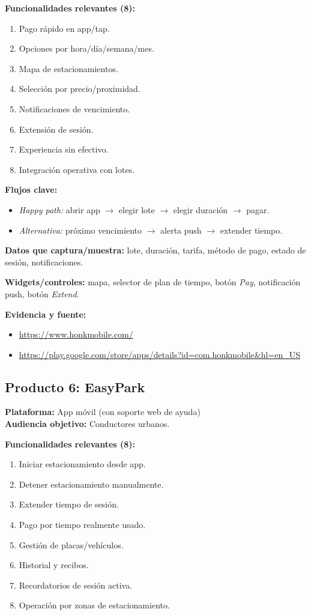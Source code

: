 \documentclass[11pt]{article}
\begin{document}
\textbf{Funcionalidades relevantes (8):}
\begin{enumerate}
\item Pago rápido en app/tap.
\item Opciones por hora/día/semana/mes.
\item Mapa de estacionamientos.
\item Selección por precio/proximidad.
\item Notificaciones de vencimiento.
\item Extensión de sesión.
\item Experiencia sin efectivo.
\item Integración operativa con lotes.
\end{enumerate}

\textbf{Flujos clave:}
\begin{itemize}
\item \textit{Happy path:} abrir app $\rightarrow$ elegir lote $\rightarrow$ elegir duración $\rightarrow$ pagar.
\item \textit{Alternativa:} próximo vencimiento $\rightarrow$ alerta push $\rightarrow$ extender tiempo.
\end{itemize}

\textbf{Datos que captura/muestra:} lote, duración, tarifa, método de pago, estado de sesión, notificaciones.

\textbf{Widgets/controles:} mapa, selector de plan de tiempo, botón \textit{Pay}, notificación push, botón \textit{Extend}.

\textbf{Evidencia y fuente:}
\begin{itemize}
\item \url{https://www.honkmobile.com/}
\item \url{https://play.google.com/store/apps/details?id=com.honkmobile&hl=en_US}
\end{itemize}

\subsection{Producto 6: EasyPark}
\textbf{Plataforma:} App móvil (con soporte web de ayuda)\\
\textbf{Audiencia objetivo:} Conductores urbanos.

\textbf{Funcionalidades relevantes (8):}
\begin{enumerate}
\item Iniciar estacionamiento desde app.
\item Detener estacionamiento manualmente.
\item Extender tiempo de sesión.
\item Pago por tiempo realmente usado.
\item Gestión de placas/vehículos.
\item Historial y recibos.
\item Recordatorios de sesión activa.
\item Operación por zonas de estacionamiento.
\end{enumerate}
\end{document}
